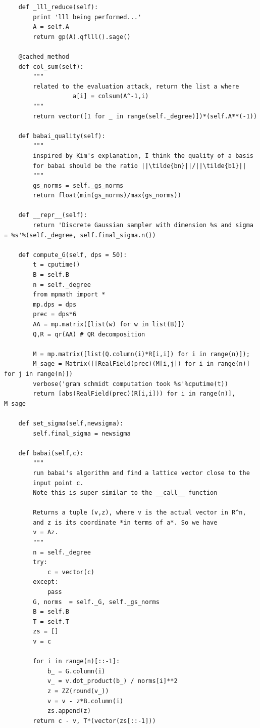 \documentclass[envcountsame]{llncs}
\begin{document}
\begin{verbatim}
    def _lll_reduce(self):
        print 'lll being performed...'
        A = self.A
        return gp(A).qflll().sage()

    @cached_method
    def col_sum(self):
        """
        related to the evaluation attack, return the list a where
                   a[i] = colsum(A^-1,i)
        """
        return vector([1 for _ in range(self._degree)])*(self.A**(-1))

    def babai_quality(self):
        """
        inspired by Kim's explanation, I think the quality of a basis
        for babai should be the ratio ||\tilde{bn}||/||\tilde{b1}||
        """
        gs_norms = self._gs_norms
        return float(min(gs_norms)/max(gs_norms))

    def __repr__(self):
        return 'Discrete Gaussian sampler with dimension %s and sigma = %s'%(self._degree, self.final_sigma.n())

    def compute_G(self, dps = 50):
        t = cputime()
        B = self.B
        n = self._degree
        from mpmath import *
        mp.dps = dps
        prec = dps*6
        AA = mp.matrix([list(w) for w in list(B)])
        Q,R = qr(AA) # QR decomposition

        M = mp.matrix([list(Q.column(i)*R[i,i]) for i in range(n)]);
        M_sage = Matrix([[RealField(prec)(M[i,j]) for i in range(n)] for j in range(n)])
        verbose('gram schmidt computation took %s'%cputime(t))
        return [abs(RealField(prec)(R[i,i])) for i in range(n)], M_sage

    def set_sigma(self,newsigma):
        self.final_sigma = newsigma

    def babai(self,c):
        """
        run babai's algorithm and find a lattice vector close to the
        input point c.
        Note this is super similar to the __call__ function

        Returns a tuple (v,z), where v is the actual vector in R^n,
        and z is its coordinate *in terms of a*. So we have
        v = Az.
        """
        n = self._degree
        try:
            c = vector(c)
        except:
            pass
        G, norms  = self._G, self._gs_norms
        B = self.B
        T = self.T
        zs = []
        v = c

        for i in range(n)[::-1]:
            b_ = G.column(i)
            v_ = v.dot_product(b_) / norms[i]**2
            z = ZZ(round(v_))
            v = v - z*B.column(i)
            zs.append(z)
        return c - v, T*(vector(zs[::-1]))


\end{verbatim}
\end{document}
